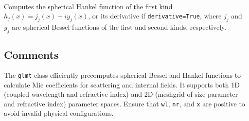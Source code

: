 \begin{description}[leftmargin=4cm]
    \item[\texttt{hankel(n, x, derivative=False)}] \hfill \\
    Computes the spherical Hankel function of the first kind \( h_j(x) = j_j(x) + i y_j(x) \), or its derivative if \texttt{derivative=True}, where \( j_j \) and \( y_j \) are spherical Bessel functions of the first and second kinds, respectively.
\end{description}

\subsection{Comments}
The \texttt{glmt} class efficiently precomputes spherical Bessel and Hankel functions to calculate Mie coefficients for scattering and internal fields. It supports both 1D (coupled wavelength and refractive index) and 2D (meshgrid of size parameter and refractive index) parameter spaces. Ensure that \texttt{wl}, \texttt{nr}, and \texttt{x} are positive to avoid invalid physical configurations. 